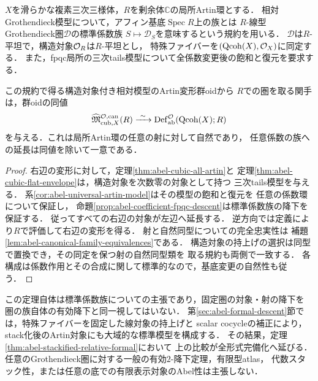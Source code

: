\begin{theorem}[標準相対Abel模型のArtin形式局所化]
\label{thm:abel-canonical-relative-formal}
$X$を滑らかな複素三次三様体，$R$を剰余体$\mathbb C$の局所Artin環とする．
相対Grothendieck模型について，アフィン基底$\operatorname{Spec}R$上の族とは
$R$-線型Grothendieck圏$\mathcal D$の標準係数族
$S\mapsto\mathcal D_S$を意味するという規約を用いる．
$\mathcal D$は$R$-平坦で，構造対象$\mathcal O_R$は$R$-平坦とし，
特殊ファイバーを$(\operatorname{Qcoh}(X),\mathcal O_X)$に同定する．
また，fpqc局所の三次tails模型について全係数変更後の飽和と復元を要求する．

この規約で得る構造対象付き相対模型のArtin変形群oidから
$R$での圏を取る関手は，群oidの同値
\[
 \widehat{\mathfrak M}^{\mathcal O,\mathrm{can}}_{\mathrm{cub},X}(R)
 \xrightarrow{\ \sim\ }
 \operatorname{Def}^{\mathcal O}_{\mathrm{ab}}
 (\operatorname{Qcoh}(X);R)
\]
を与える．これは局所Artin環の任意の射に対して自然であり，
任意係数の族への延長は同値を除いて一意である．
\end{theorem}
\begin{proof}
右辺の変形に対して，定理\ref{thm:abel-cubic-all-artin}と
定理\ref{thm:abel-cubic-flat-envelope}は，構造対象を次数零の対象として持つ
三次tails模型を与える．
系\ref{cor:abel-universal-artin-model}はその模型の飽和と復元を
任意の係数環について保証し，
命題\ref{prop:abel-coefficient-fpqc-descent}は標準係数族の降下を保証する．
従ってすべての右辺の対象が左辺へ延長する．
逆方向では定義により$R$で評価して右辺の変形を得る．
射と自然同型についての完全忠実性は
補題\ref{lem:abel-canonical-family-equivalences}である．
構造対象の持上げの選択は同型で置換でき，その同定を保つ射の自然同型類を
取る規約も両側で一致する．
各構成は係数作用とその合成に関して標準的なので，基底変更の自然性も従う．
\end{proof}

\begin{remark}[標準模型から全stackへの比較]
この定理自体は標準係数族についての主張であり，固定圏の対象・射の降下を
圏の族自体の有効降下と同一視してはいない．
第\ref{sec:abel-formal-descent}節では，特殊ファイバーを固定した線対象の持上げと
scalar cocycleの補正により，stack化後のArtin対象にも大域的な標準模型を構成する．
その結果，定理\ref{thm:abel-stackified-relative-formal}において
上の比較が全形式完備化へ延びる．
任意のGrothendieck圏に対する一般の有効$2$-降下定理，有限型atlas，
代数スタック性，または任意の底での有限表示対象のAbel性は主張しない．
\end{remark}
